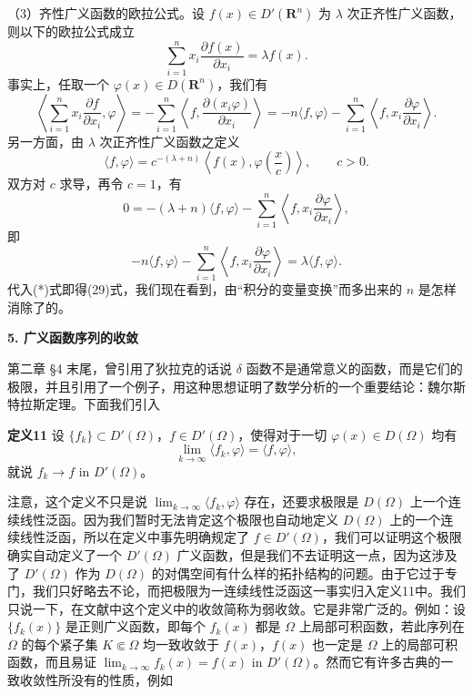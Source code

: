 （3）齐性广义函数的欧拉公式。设 $f(x)\in D'(\mathbf R^n)$ 为 $\lambda$ 次正齐性广义函数，则以下的欧拉公式成立
\begin{equation}
 \sum_{i=1}^n x_i\frac{\partial f(x)}{\partial x_i}=\lambda f(x).
 \tag{29}
\end{equation}
事实上，任取一个 $\varphi(x)\in D(\mathbf R^n)$，我们有
\[
 \left\langle\sum_{i=1}^n x_i\frac{\partial f}{\partial x_i},\varphi\right\rangle
 =-\sum_{i=1}^n\left\langle f,\frac{\partial(x_i\varphi)}{\partial x_i}\right\rangle
 =-n\langle f,\varphi\rangle-\sum_{i=1}^n\left\langle f,x_i\frac{\partial\varphi}{\partial x_i}\right\rangle.
\tag{*}
\]
另一方面，由 $\lambda$ 次正齐性广义函数之定义
\[
 \langle f,\varphi\rangle
 =c^{-(\lambda+n)}\left\langle f(x),\varphi\!\left(\frac{x}{c}\right)\right\rangle,
 \qquad c>0.
\]
双方对 $c$ 求导，再令 $c=1$，有
\[
 0=-(\lambda+n)\langle f,\varphi\rangle
 -\sum_{i=1}^n\left\langle f,x_i\frac{\partial\varphi}{\partial x_i}\right\rangle,
\]
即
\[
 -n\langle f,\varphi\rangle
 -\sum_{i=1}^n\left\langle f,x_i\frac{\partial\varphi}{\partial x_i}\right\rangle
 =\lambda\langle f,\varphi\rangle.
\]
代入(*)式即得(29)式，我们现在看到，由“积分的变量变换”而多出来的 $n$ 是怎样消除了的。

\medskip
\noindent\textbf{5. 广义函数序列的收敛}

第二章 §4 末尾，曾引用了狄拉克的话说 $\delta$ 函数不是通常意义的函数，而是它们的极限，并且引用了一个例子，用这种思想证明了数学分析的一个重要结论：魏尔斯特拉斯定理。下面我们引入

\noindent\textbf{定义11}
设 $\{f_k\}\subset D'(\Omega)$，$f\in D'(\Omega)$，使得对于一切 $\varphi(x)\in D(\Omega)$ 均有
\begin{equation}
 \lim_{k\to\infty}\langle f_k,\varphi\rangle=\langle f,\varphi\rangle,
 \tag{30}
\end{equation}
就说 $f_k\to f$ in $D'(\Omega)$。

注意，这个定义不只是说 $\lim_{k\to\infty}\langle f_k,\varphi\rangle$ 存在，还要求极限是 $D(\Omega)$ 上一个连续线性泛函。因为我们暂时无法肯定这个极限也自动地定义 $D(\Omega)$ 上的一个连续线性泛函，所以在定义中事先明确规定了 $f\in D'(\Omega)$，我们可以证明这个极限确实自动定义了一个 $D'(\Omega)$ 广义函数，但是我们不去证明这一点，因为这涉及了 $D'(\Omega)$ 作为 $D(\Omega)$ 的对偶空间有什么样的拓扑结构的问题。由于它过于专门，我们只好略去不论，而把极限为一连续线性泛函这一事实归入定义11中。我们只说一下，在文献中这个定义中的收敛简称为弱收敛。它是非常广泛的。例如：设 $\{f_k(x)\}$ 是正则广义函数，即每个 $f_k(x)$ 都是 $\Omega$ 上局部可积函数，若此序列在 $\Omega$ 的每个紧子集 $K\Subset\Omega$ 均一致收敛于 $f(x)$，$f(x)$ 也一定是 $\Omega$ 上的局部可积函数，而且易证 $\lim_{k\to\infty}f_k(x)=f(x)$ in $D'(\Omega)$。然而它有许多古典的一致收敛性所没有的性质，例如

